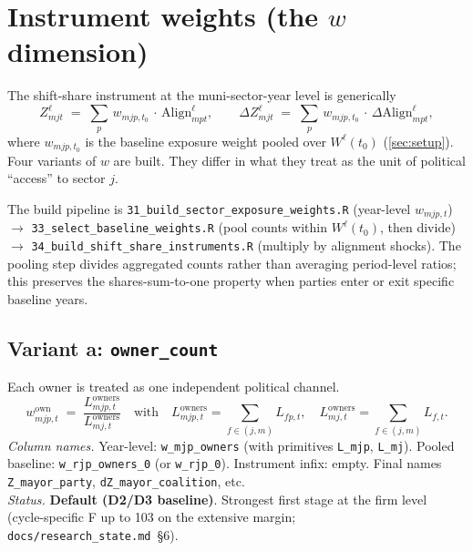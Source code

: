 \documentclass[12pt]{article}
\theoremstyle{definition}
\newcommand{\Align}{\mathrm{Align}}
\begin{document}
\section{Instrument weights (the $w$ dimension)}
\label{sec:weights}

The shift-share instrument at the muni-sector-year level is generically
\begin{equation}
\label{eq:ssiv}
Z^{\ell}_{m j t} \;=\; \sum_{p}\, w_{m j p, t_0}\,\cdot\,\Align^{\ell}_{m p t},
\qquad
\Delta Z^{\ell}_{m j t} \;=\; \sum_{p}\, w_{m j p, t_0}\,\cdot\,\Delta \Align^{\ell}_{m p t},
\end{equation}
where $w_{m j p, t_0}$ is the baseline exposure weight pooled over $W^\ell(t_0)$ (\cref{sec:setup}). Four variants of $w$ are built. They differ in what they treat as the unit of political ``access'' to sector $j$.

The build pipeline is \texttt{31\_build\_sector\_exposure\_weights.R} (year-level $w_{m j p, t}$) $\to$ \texttt{33\_select\_baseline\_weights.R} (pool counts within $W^\ell(t_0)$, then divide) $\to$ \texttt{34\_build\_shift\_share\_instruments.R} (multiply by alignment shocks). The pooling step divides aggregated counts rather than averaging period-level ratios; this preserves the shares-sum-to-one property when parties enter or exit specific baseline years.

\subsection{Variant a: \texttt{owner\_count}}
Each owner is treated as one independent political channel.
\begin{equation}
w^{\text{own}}_{m j p, t} \;=\; \frac{L^{\text{owners}}_{m j p, t}}{L^{\text{owners}}_{m j, t}}
\quad\text{with}\quad
L^{\text{owners}}_{m j p, t} = \sum_{f \in (j,m)} L_{fp,t},
\quad
L^{\text{owners}}_{m j, t} = \sum_{f \in (j,m)} L_{f, t}.
\end{equation}
\textit{Column names.} Year-level: \texttt{w\_mjp\_owners} (with primitives \texttt{L\_mjp}, \texttt{L\_mj}). Pooled baseline: \texttt{w\_rjp\_owners\_0} (or \texttt{w\_rjp\_0}). Instrument infix: empty. Final names \texttt{Z\_mayor\_party}, \texttt{dZ\_mayor\_coalition}, etc.\\
\textit{Status.} \textbf{Default (D2/D3 baseline)}. Strongest first stage at the firm level (cycle-specific F up to 103 on the extensive margin; \texttt{docs/research\_state.md}~\S6).
\end{document}
